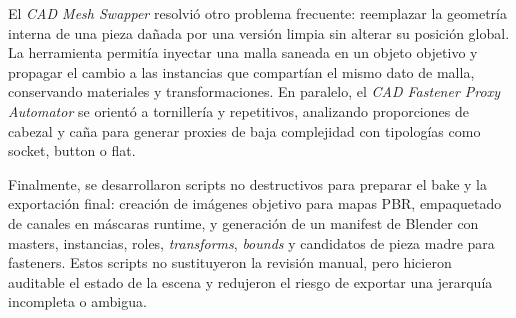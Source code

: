 El \textit{CAD Mesh Swapper} resolvió otro problema frecuente: reemplazar la geometría interna de una pieza dañada por una versión limpia sin alterar su posición global. La herramienta permitía inyectar una malla saneada en un objeto objetivo y propagar el cambio a las instancias que compartían el mismo dato de malla, conservando materiales y transformaciones. En paralelo, el \textit{CAD Fastener Proxy Automator} se orientó a tornillería y repetitivos, analizando proporciones de cabezal y caña para generar proxies de baja complejidad con tipologías como socket, button o flat.

Finalmente, se desarrollaron scripts no destructivos para preparar el bake y la exportación final: creación de imágenes objetivo para mapas PBR, empaquetado de canales en máscaras runtime, y generación de un manifest de Blender con masters, instancias, roles, \textit{transforms}, \textit{bounds} y candidatos de pieza madre para fasteners. Estos scripts no sustituyeron la revisión manual, pero hicieron auditable el estado de la escena y redujeron el riesgo de exportar una jerarquía incompleta o ambigua.

